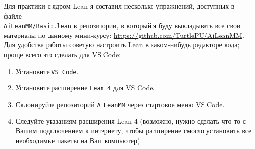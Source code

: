 Для практики с ядром Lean я составил несколько
упражнений, доступных в файле \\
\texttt{AiLeanMM/Basic.lean} в репозитории, в который я
буду выкладывать все свои материалы по данному
мини-курсу: \url{https://github.com/TurtlePU/AiLeanMM}.
Для удобства работы советую настроить Lean в
каком-нибудь редакторе кода; проще всего это сделать для
VS Code:
\begin{enumerate}
    \item Установите \texttt{VS Code}.
    \item Установите расширение \texttt{Lean 4}
        для VS Code.
    \item Склонируйте репозиторий \texttt{AiLeanMM}
        через стартовое меню VS Code.
    \item Следуйте указаниям расширения Lean 4
        (возможно, нужно сделать что-то с Вашим
        подключением к интернету, чтобы расширение
        смогло установить все необходимые пакеты на Ваш
        компьютер).
\end{enumerate}


